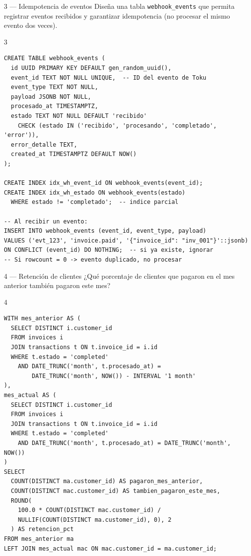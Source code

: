\documentclass[11pt,a4paper]{article}
\begin{document}
\begin{ejerciciobox}{3 — Idempotencia de eventos}
Diseña una tabla \texttt{webhook\_events} que permita registrar eventos recibidos
y garantizar idempotencia (no procesar el mismo evento dos veces).
\end{ejerciciobox}

\begin{solucionbox}{3}
\begin{lstlisting}[style=sql]
CREATE TABLE webhook_events (
  id UUID PRIMARY KEY DEFAULT gen_random_uuid(),
  event_id TEXT NOT NULL UNIQUE,  -- ID del evento de Toku
  event_type TEXT NOT NULL,
  payload JSONB NOT NULL,
  procesado_at TIMESTAMPTZ,
  estado TEXT NOT NULL DEFAULT 'recibido'
    CHECK (estado IN ('recibido', 'procesando', 'completado', 'error')),
  error_detalle TEXT,
  created_at TIMESTAMPTZ DEFAULT NOW()
);

CREATE INDEX idx_wh_event_id ON webhook_events(event_id);
CREATE INDEX idx_wh_estado ON webhook_events(estado)
  WHERE estado != 'completado';  -- indice parcial

-- Al recibir un evento:
INSERT INTO webhook_events (event_id, event_type, payload)
VALUES ('evt_123', 'invoice.paid', '{"invoice_id": "inv_001"}'::jsonb)
ON CONFLICT (event_id) DO NOTHING;  -- si ya existe, ignorar
-- Si rowcount = 0 -> evento duplicado, no procesar
\end{lstlisting}
\end{solucionbox}

\begin{ejerciciobox}{4 — Retención de clientes}
¿Qué porcentaje de clientes que pagaron en el mes anterior también pagaron este mes?
\end{ejerciciobox}

\begin{solucionbox}{4}
\begin{lstlisting}[style=sql]
WITH mes_anterior AS (
  SELECT DISTINCT i.customer_id
  FROM invoices i
  JOIN transactions t ON t.invoice_id = i.id
  WHERE t.estado = 'completed'
    AND DATE_TRUNC('month', t.procesado_at) =
        DATE_TRUNC('month', NOW()) - INTERVAL '1 month'
),
mes_actual AS (
  SELECT DISTINCT i.customer_id
  FROM invoices i
  JOIN transactions t ON t.invoice_id = i.id
  WHERE t.estado = 'completed'
    AND DATE_TRUNC('month', t.procesado_at) = DATE_TRUNC('month', NOW())
)
SELECT
  COUNT(DISTINCT ma.customer_id) AS pagaron_mes_anterior,
  COUNT(DISTINCT mac.customer_id) AS tambien_pagaron_este_mes,
  ROUND(
    100.0 * COUNT(DISTINCT mac.customer_id) /
    NULLIF(COUNT(DISTINCT ma.customer_id), 0), 2
  ) AS retencion_pct
FROM mes_anterior ma
LEFT JOIN mes_actual mac ON mac.customer_id = ma.customer_id;
\end{lstlisting}
\end{solucionbox}
\end{document}
